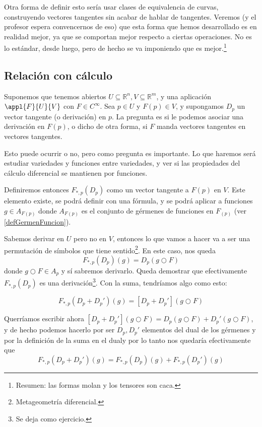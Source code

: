 \documentclass{apuntes}
\begin{document}
Otra forma de definir esto sería usar clases de equivalencia de curvas, construyendo vectores tangentes sin acabar de hablar de tangentes. Veremos (y el profesor espera convencernos de eso) que esta forma que hemos desarrollado es en realidad mejor, ya que se comportan mejor respecto a ciertas operaciones. No es lo estándar, desde luego, pero de hecho se va imponiendo que es mejor.\footnote{Resumen: las formas molan y los tensores son caca.}

\subsection{Relación con cálculo}

Suponemos que tenemos abiertos $U⊆ℝ^n, V⊆ℝ^m$, y una aplicación $\appl{F}{U}{V}$ con $F ∈ C^∞$. Sea $p ∈U$ y $F(p) ∈V$, y supongamos $D_p$ un vector tangente (o derivación) en $p$. La pregunta es si le podemos asociar una derivación en $F(p)$, o dicho de otra forma, si $F$ manda vectores tangentes en vectores tangentes.

Esto puede ocurrir o no, pero como pregunta es importante. Lo que haremos será estudiar variedades y funciones entre variedades, y ver si las propiedades del cálculo diferencial se mantienen por funciones.

Definiremos entonces $F_{*,p}(D_p)$ como un vector tangente a $F(p)$ en $V$. Este elemento existe, se podrá definir con una fórmula, y se podrá aplicar a funciones $g ∈ A_{F(p)}$ donde $A_{F(p)}$ es el conjunto de gérmenes de funciones en $F_{(p)}$ (ver \ref{defGermenFuncion}).

Sabemos derivar en $U$ pero no en $V$, entonces lo que vamos a hacer va a ser una permutación de símbolos que tiene sentido\footnote{Metageometría diferencial.}. En este caso, nos queda \[ F_{*,p}(D_p)(g) = D_p (g ○ F)\] donde $g ○ F ∈ A_p$ y sí sabremos derivarlo. Queda demostrar que efectivamente $F_{*,p}(D_p)$ es una derivación\footnote{Se deja como ejercicio.}. Con la suma, tendríamos algo como esto:

\[ F_{*,p}(D_p + D_p')(g) = [D_p + D_p'](g○F) \]

Querríamos escribir ahora  $[D_p + D_p'](g○F) = D_p (g○F) + D_p'(g○F)$, y de hecho podemos hacerlo por ser $D_p, D_p'$ elementos del dual de los gérmenes y por la definición de la suma en el dual\footnotemark y por lo tanto nos quedaría efectivamente que \[ F_{*,p}(D_p + D_p')(g) = F_{*,p}(D_p)(g) + F_{*,p}(D_p')(g) \]

\end{document}

